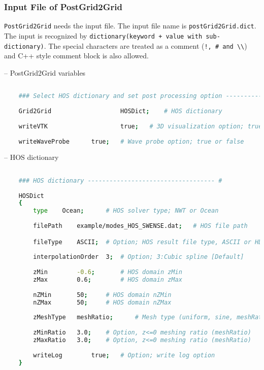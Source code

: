 	\pagebreak
	\subsubsection{Input File of PostGrid2Grid}
	
	\texttt{PostGrid2Grid} needs the input file. The input file name is \texttt{postGrid2Grid.dict}. The input is recognized by \texttt{dictionary(keyword + value with sub-dictionary)}. The special characters are treated as a comment (\texttt{!, \# and \textbackslash\textbackslash}) and C++ style comment block is also allowed. 
	
	\vspace{0.5cm}
	
	-- PostGrid2Grid variables 
	
	\begin{lstlisting}[language=bash]
	
	### Select HOS dictionary and set post processing option ----------------------------------- #
	
	Grid2Grid					HOSDict;	# HOS dictionary
	
	writeVTK					true;	# 3D visualization option; true or false
	
	writeWaveProbe		true;	# Wave probe option; true or false

	\end{lstlisting}
	
	
	-- HOS dictionary
	
	\begin{lstlisting}[language=bash]
	
	### HOS dictionary ----------------------------------- #
	
	HOSDict
	{
		type	Ocean;		# HOS solver type; NWT or Ocean
		
		filePath	example/modes_HOS_SWENSE.dat;	# HOS file path

		fileType	ASCII;	# Option; HOS result file type, ASCII or HDF5
		
		interpolationOrder	3;	# Option; 3:Cubic spline [Default]
		
		zMin		-0.6;		# HOS domain zMin		
		zMax		0.6;		# HOS domain zMax
		
		nZMin		50;		# HOS domain nZMin
		nZMax		50;		# HOS domain nZMax
		
		zMeshType	meshRatio;		# Mesh type (uniform, sine, meshRatio)
		
		zMinRatio	3.0;	# Option, z<=0 meshing ratio (meshRatio)
		zMaxRatio	3.0;	# Option, z<=0 meshing ratio (meshRatio)
				
		writeLog        true;	# Option; write log option	
	}
	\end{lstlisting}
	
